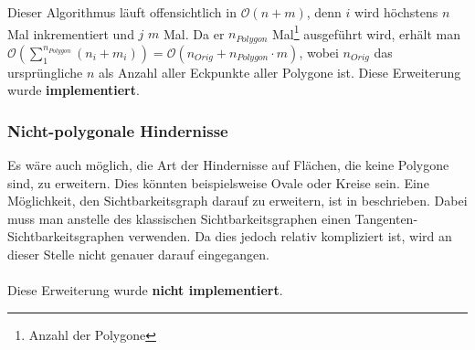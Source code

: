 \documentclass[a4paper, notitlepage, 12pt]{scrartcl}
\begin{document}
\hspace*{-1em}Dieser Algorithmus läuft offensichtlich in $\mathcal{O}(n + m)$, denn $i$ wird höchstens $n$ Mal inkrementiert und $j$ $m$ Mal. Da er $n_{Polygon}$ Mal\footnote{Anzahl der Polygone} ausgeführt wird, erhält man $\mathcal{O}(\sum_{1}^{n_{Polygon}} (n_i + m_i)) = \mathcal{O}(n_{Orig} + n_{Polygon} \cdot m)$, wobei $n_{Orig}$ das ursprüngliche $n$ als Anzahl aller Eckpunkte aller Polygone ist. Diese Erweiterung wurde \textbf{implementiert}.
 \subsubsection{Nicht-polygonale Hindernisse}
 Es wäre auch möglich, die Art der Hindernisse auf Flächen, die keine Polygone sind, zu erweitern. Dies könnten beispielsweise Ovale oder Kreise sein. Eine Möglichkeit, den Sichtbarkeitsgraph darauf zu erweitern, ist in \cite{Src:arcvis} beschrieben. Dabei muss man anstelle des klassischen Sichtbarkeitsgraphen einen Tangenten-Sichtbarkeitsgraphen verwenden. Da dies jedoch relativ kompliziert ist, wird an dieser Stelle nicht genauer darauf eingegangen. \\ \\
 Diese Erweiterung wurde \textbf{nicht implementiert}.
\end{document}
